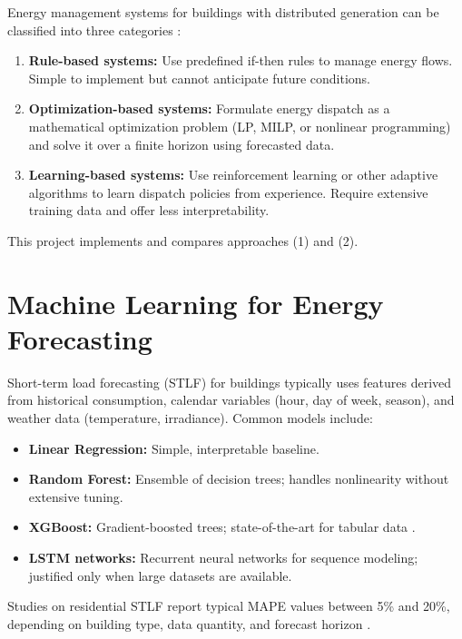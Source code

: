 Energy management systems for buildings with distributed generation can be classified into three categories \cite{ems_review}:

\begin{enumerate}
    \item \textbf{Rule-based systems:} Use predefined if-then rules to manage energy flows. Simple to implement but cannot anticipate future conditions.

    \item \textbf{Optimization-based systems:} Formulate energy dispatch as a mathematical optimization problem (LP, MILP, or nonlinear programming) and solve it over a finite horizon using forecasted data.

    \item \textbf{Learning-based systems:} Use reinforcement learning or other adaptive algorithms to learn dispatch policies from experience. Require extensive training data and offer less interpretability.
\end{enumerate}

This project implements and compares approaches (1) and (2).

\section{Machine Learning for Energy Forecasting}

Short-term load forecasting (STLF) for buildings typically uses features derived from historical consumption, calendar variables (hour, day of week, season), and weather data (temperature, irradiance). Common models include:

\begin{itemize}[nosep]
    \item \textbf{Linear Regression:} Simple, interpretable baseline.
    \item \textbf{Random Forest:} Ensemble of decision trees; handles nonlinearity without extensive tuning.
    \item \textbf{XGBoost:} Gradient-boosted trees; state-of-the-art for tabular data \cite{xgboost}.
    \item \textbf{LSTM networks:} Recurrent neural networks for sequence modeling; justified only when large datasets are available.
\end{itemize}

Studies on residential STLF report typical MAPE values between 5\% and 20\%, depending on building type, data quantity, and forecast horizon \cite{sklearn}.

